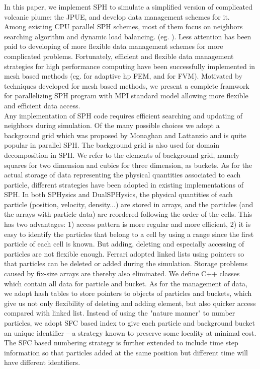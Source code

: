 \documentclass[conference,compsoc]{IEEEtran}
\begin{document}
In this paper, we implement SPH to simulate a simplified version of complicated volcanic plume: the JPUE, and develop data management schemes for it.\\
Among existing CPU parallel SPH schemes, most of them focus on neighbors searching algorithm and dynamic load balancing. (eg. \cite{ferrari2009new, crespo2015dualsphysics}). Less attention has been paid to developing of more flexible data management schemes for more complicated problems. 
Fortunately, efficient and flexible data management strategies for high performance computing have been successfully implemented in mesh based methods (eg. \cite{laszloffy2000simple} for adaptive hp FEM, and \cite{pitman2003computing, patra2005parallel} for FVM). Motivated by techniques developed for mesh based methods, we present a complete framwork for parallelizing SPH program with MPI standard model allowing more flexible and efficient data access.\\
Any implementation of SPH code requires efficient searching and updating of neighbors during simulation. Of the many possible choices we adopt a background grid which was proposed by Monaghan and Lattanzio\cite{monaghan1985refined} and is quite popular in parallel SPH. The background grid is also used for domain decomposition in SPH. We refer to the elements of background grid, namely squares for two dimension and cubics for three dimension, as buckets. 
%
%
As for the actual storage of data representing the physical quantities associated to each particle, different strategies have been adopted in existing implementations of SPH. 
In both SPHysics and DualSPHysics\cite{crespo2015dualsphysics}, the physical quantities of each particle (position, velocity, density...) are stored in arrays, and the particles (and the arrays with particle data) are reordered following the order of the cells. This has two advantages: 1) access pattern is more regular and more efficient, 2) it is easy to identify the particles that belong to a cell by using a range since the first particle of each cell is known. But adding, deleting and especially accessing of particles are not flexible enough. Ferrari\cite{ferrari2009new} adopted linked lists using pointers so that particles can be deleted or added during the simulation. Storage problems caused by fix-size arrays are thereby also eliminated. We define C++ classes which contain all data for particle and bucket. As for the management of data, we adopt hash tables to store pointers to objects of particles and buckets, which give us not only flexibility of deleting and adding element, but also quicker access compared with linked list. Instead of using the "nature manner" to number particles, we adopt SFC based index to give each particle and background bucket an unique identifier -- a strategy known to preserve some locality at minimal cost. The SFC based numbering strategy is further extended to include time step information so that particles added at the same position but different time will have different identifiers. 
\end{document}
